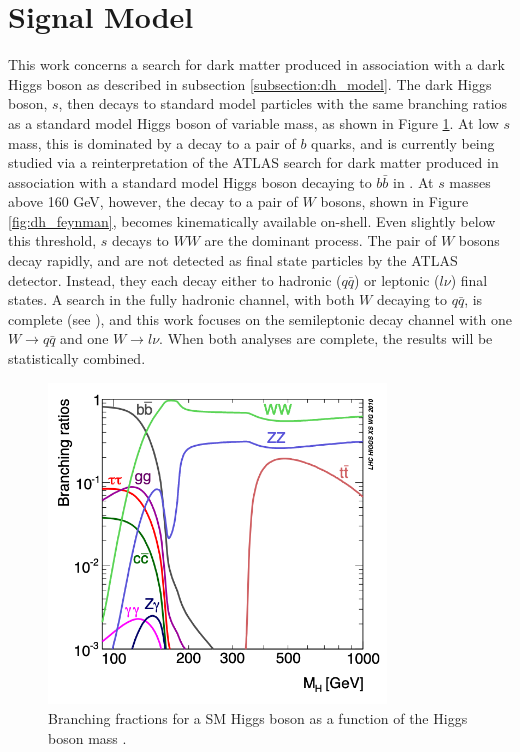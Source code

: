 \label{chapter:ana_prep}

\section{Signal Model}
This work concerns a search for dark matter produced in association with a dark Higgs boson as described in subsection \ref{subsection:dh_model}.  The dark Higgs boson, $s$, then decays to standard model particles with the same branching ratios as a standard model Higgs boson of variable mass, as shown in Figure \ref{fig:HiggsBR}. At low $s$ mass, this is dominated by a decay to a pair of $b$ quarks, and is currently being studied via a reinterpretation of the ATLAS search for dark matter produced in association with a standard model Higgs boson decaying to $b\bar{b}$ in \cite{monos_bb}. At $s$ masses above 160 GeV, however, the decay to a pair of $W$ bosons, shown in Figure \ref{fig:dh_feynman}, becomes kinematically available on-shell. Even slightly below this threshold, $s$ decays to $WW$ are the dominant process. The pair of $W$ bosons decay rapidly, and are not detected as final state particles by the ATLAS detector. Instead, they each decay either to hadronic ($q\bar{q}$) or leptonic ($l\nu$) final states. A search in the fully hadronic channel, with both $W$ decaying to $q\bar{q}$, is complete (see \cite{had_analy}), and this work focuses on the semileptonic decay channel with one $ W \rightarrow q\bar{q} $ and one $ W \rightarrow l\nu $. When both analyses are complete, the results will be statistically combined.

\begin{figure}[H]
    \centering
    \includegraphics[width=0.8\textwidth]{Figures/3/HiggsBR.png}
    \caption{Branching fractions for a SM Higgs boson as a function of the Higgs boson mass \cite{Higgs_BR}.}
    \label{fig:HiggsBR}
\end{figure}

